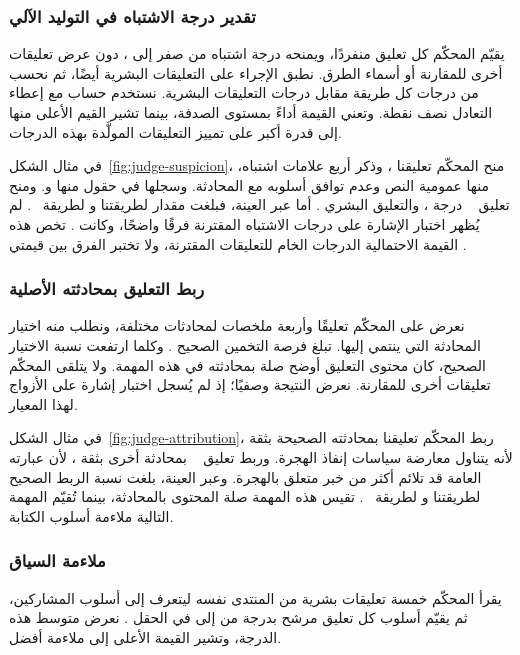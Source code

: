 \subsubsection{تقدير درجة الاشتباه في التوليد الآلي}
يقيّم المحكّم كل تعليق منفردًا، ويمنحه درجة اشتباه من صفر إلى ، دون عرض تعليقات أخرى للمقارنة أو أسماء الطرق.
نطبق الإجراء على التعليقات البشرية أيضًا، ثم نحسب  من درجات كل طريقة مقابل درجات التعليقات البشرية.
نستخدم حساب  مع إعطاء التعادل نصف نقطة. وتعني القيمة  أداءً بمستوى الصدفة، بينما تشير القيم الأعلى منها إلى قدرة أكبر على تمييز التعليقات المولَّدة بهذه الدرجات.

في مثال الشكل~\ref{fig:judge-suspicion}، منح المحكّم تعليقنا ، وذكر أربع علامات اشتباه، منها عمومية النص وعدم توافق أسلوبه مع المحادثة.
وسجلها في حقول منها  و.
ومنح تعليق ~\cite{lin2024zero} درجة ، والتعليق البشري .
أما عبر العينة، فبلغت  مقدار  لطريقتنا و لطريقة ~\cite{lin2024zero}.
لم يُظهر اختبار الإشارة على درجات الاشتباه المقترنة فرقًا واضحًا، وكانت .
تخص هذه القيمة الاحتمالية الدرجات الخام للتعليقات المقترنة، ولا تختبر الفرق بين قيمتي .

\subsubsection{ربط التعليق بمحادثته الأصلية}
نعرض على المحكّم تعليقًا وأربعة ملخصات لمحادثات مختلفة، ونطلب منه اختيار المحادثة التي ينتمي إليها.
تبلغ فرصة التخمين الصحيح . وكلما ارتفعت نسبة الاختيار الصحيح، كان محتوى التعليق أوضح صلة بمحادثته في هذه المهمة.
ولا يتلقى المحكّم تعليقات أخرى للمقارنة. نعرض النتيجة وصفيًا؛ إذ لم يُسجل اختبار إشارة على الأزواج لهذا المعيار.

في مثال الشكل~\ref{fig:judge-attribution}، ربط المحكّم تعليقنا بمحادثته الصحيحة بثقة  لأنه يتناول معارضة سياسات إنفاذ الهجرة.
وربط تعليق ~\cite{lin2024zero} بمحادثة أخرى بثقة ، لأن عبارته العامة قد تلائم أكثر من خبر متعلق بالهجرة.
وعبر العينة، بلغت نسبة الربط الصحيح  لطريقتنا و لطريقة ~\cite{lin2024zero}.
تقيس هذه المهمة صلة المحتوى بالمحادثة، بينما تُقيّم المهمة التالية ملاءمة أسلوب الكتابة.

\subsubsection{ملاءمة السياق}
يقرأ المحكّم خمسة تعليقات بشرية من المنتدى نفسه ليتعرف إلى أسلوب المشاركين، ثم يقيّم أسلوب كل تعليق مرشح بدرجة من  إلى  في الحقل .
نعرض متوسط هذه الدرجة، وتشير القيمة الأعلى إلى ملاءمة أفضل.

